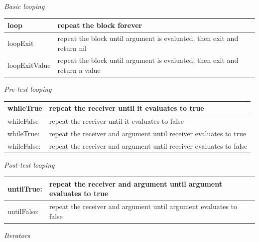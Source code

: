 \documentclass[letterpaper,10pt,english]{sphinxmanual}
\begin{document}
\emph{Basic looping}

\begin{tabulary}{\linewidth}{p{5cm} p{10cm}}
\hline

loop
 & 
repeat the block forever
\\\hline

loopExit
 & 
repeat the block until argument is evaluated; then exit and return nil
\\\hline

loopExitValue
 & 
repeat the block until argument is evaluated; then exit and return a value
\\\hline
\end{tabulary}


\emph{Pre-test looping}

\begin{tabulary}{\linewidth}{p{5cm} p{10cm}}
\hline

whileTrue
 & 
repeat the receiver until it evaluates to true
\\\hline

whileFalse
 & 
repeat the receiver until it evaluates to false
\\\hline

whileTrue:
 & 
repeat the receiver and argument until receiver evaluates to true
\\\hline

whileFalse:
 & 
repeat the receiver and argument until receiver evaluates to false
\\\hline
\end{tabulary}


\emph{Post-test looping}

\begin{tabulary}{\linewidth}{p{5cm} p{10cm}}
\hline

untilTrue:
 & 
repeat the receiver and argument until argument evaluates to true
\\\hline

untilFalse:
 & 
repeat the receiver and argument until argument evaluates to false
\\\hline
\end{tabulary}


\emph{Iterators}
\end{document}
